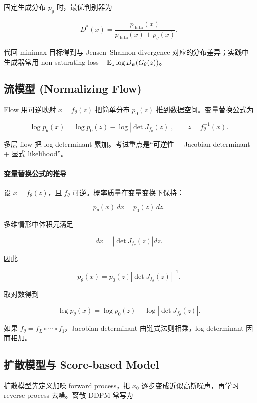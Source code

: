 \documentclass[11pt]{ctexart}
\begin{document}
固定生成分布 \(p_g\) 时，最优判别器为

\[
  D^*(x)=\frac{p_{\mathrm{data}}(x)}{p_{\mathrm{data}}(x)+p_g(x)}.
\]

代回 minimax 目标得到与 Jensen--Shannon divergence 对应的分布差异；实践中生成器常用 non-saturating loss \(-\mathbb{E}_z\log D_\psi(G_\theta(z))\)。

\subsection{流模型 (Normalizing Flow)}


Flow 用可逆映射 \(x=f_\theta(z)\) 把简单分布 \(p_0(z)\) 推到数据空间。变量替换公式为

\[
  \log p_\theta(x)
  =
  \log p_0(z)
  -
  \log\left|\det J_{f_\theta}(z)\right|,
  \qquad
  z=f_\theta^{-1}(x).
\]

多层 flow 把 log determinant 累加。考试重点是“可逆性 + Jacobian determinant + 显式 likelihood”。

\paragraph{变量替换公式的推导}

设 \(x=f_\theta(z)\)，且 \(f_\theta\) 可逆。概率质量在变量变换下保持：

\[
  p_\theta(x)\,dx
  =
  p_0(z)\,dz.
\]

多维情形中体积元满足

\[
  dx
  =
  \left|\det J_{f_\theta}(z)\right|dz.
\]

因此

\[
  p_\theta(x)
  =
  p_0(z)
  \left|
    \det J_{f_\theta}(z)
  \right|^{-1}.
\]

取对数得到

\[
  \log p_\theta(x)
  =
  \log p_0(z)
  -
  \log\left|\det J_{f_\theta}(z)\right|.
\]

如果 \(f_\theta=f_L\circ\cdots\circ f_1\)，Jacobian determinant 由链式法则相乘，log determinant 因而相加。

\subsection{扩散模型与 Score-based Model}


扩散模型先定义加噪 forward process，把 \(x_0\) 逐步变成近似高斯噪声，再学习 reverse process 去噪。离散 DDPM 常写为
\end{document}

